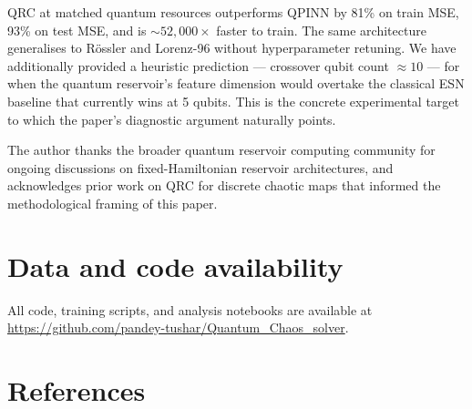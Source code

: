 \documentclass[a4paper,12pt]{iopart}
\begin{document}
QRC at matched quantum resources outperforms QPINN by 81\% on train
MSE, 93\% on test MSE, and is $\sim 52{,}000\times$ faster to train.
The same architecture generalises to R\"{o}ssler and Lorenz-96 without
hyperparameter retuning. We have additionally provided a heuristic
prediction --- crossover qubit count $\approx 10$ --- for when the
quantum reservoir's feature dimension would overtake the classical
ESN baseline that currently wins at 5 qubits. This is the concrete
experimental target to which the paper's diagnostic argument naturally
points.

\ack
The author thanks the broader quantum reservoir computing community
for ongoing discussions on fixed-Hamiltonian reservoir architectures,
and acknowledges prior work on QRC for discrete chaotic maps that
informed the methodological framing of this paper.

\section*{Data and code availability}
\label{sec:availability}
All code, training scripts, and analysis notebooks are available at
\url{https://github.com/pandey-tushar/Quantum_Chaos_solver}.

\section*{References}
\end{document}
